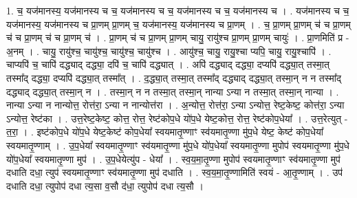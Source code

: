 \documentclass[17pt]{extarticle}
\begin{document}
1. च॒ यज॑मानस्य॒ यज॑मानस्य च च॒ यज॑मानस्य च च॒ यज॑मानस्य च च॒ यज॑मानस्य च । . यज॑मानस्य च च॒ यज॑मानस्य॒ यज॑मानस्य च प्रा॒णम् प्रा॒णम् च॒ यज॑मानस्य॒ यज॑मानस्य च प्रा॒णम् । . च॒ प्रा॒णम् प्रा॒णम् च॑ च प्रा॒णम् च॑ च प्रा॒णम् च॑ च प्रा॒णम् च॑ । . प्रा॒णम् च॑ च प्रा॒णम् प्रा॒णम् चायु॒ रायु॑श्च प्रा॒णम् प्रा॒णम् चायुः॑ । . प्रा॒णमिति॑ प्र - अ॒नम् । . चायु॒ रायु॑श्च॒ चायु॑श्च॒ चायु॑श्च॒ चायु॑श्च । . आयु॑श्च॒ चायु॒ रायु॒श्चा प्यपि॒ चायु॒ रायु॒श्चापि॑ । . चाप्यपि॑ च॒ चापि॑ दद्ध्याद् दद्ध्या॒ दपि॑ च॒ चापि॑ दद्ध्यात् । . अपि॑ दद्ध्याद् दद्ध्या॒ दप्यपि॑ दद्ध्या॒त् तस्मा॒त् तस्मा᳚द् दद्ध्या॒ दप्यपि॑ दद्ध्या॒त् तस्मा᳚त् । . द॒द्ध्या॒त् तस्मा॒त् तस्मा᳚द् दद्ध्याद् दद्ध्या॒त् तस्मा॒न् न न तस्मा᳚द् दद्ध्याद् दद्ध्या॒त् तस्मा॒न् न । . तस्मा॒न् न न तस्मा॒त् तस्मा॒न् नान्या ऽन्या न तस्मा॒त् तस्मा॒न् नान्या । . नान्या ऽन्या न नान्योत्त॒ रोत्त॑रा॒ ऽन्या न नान्योत्त॑रा । . अ॒न्योत्त॒ रोत्त॑रा॒ ऽन्या ऽन्योत्त॒ रेष्ट॒केष्ट॒ कोत्त॑रा॒ ऽन्या ऽन्योत्त॒ रेष्ट॑का । . उत्त॒रेष्ट॒केष्ट॒ कोत्त॒ रोत्त॒ रेष्ट॑कोप॒धे यो॑प॒धे येष्ट॒कोत्त॒ रोत्त॒ रेष्ट॑कोप॒धेया᳚ । . उत्त॒रेत्युत् - त॒रा॒ । . इष्ट॑कोप॒धे यो॑प॒धे येष्ट॒केष्ट॑ कोप॒धेया᳚ स्वयमातृ॒ण्णाꣳ स्व॑यमातृ॒ण्णा मु॑प॒धे येष्ट॒ केष्ट॑ कोप॒धेया᳚ स्वयमातृ॒ण्णाम् । . उ॒प॒धेया᳚ स्वयमातृ॒ण्णाꣳ स्व॑यमातृ॒ण्णा मु॑प॒धे यो॑प॒धेया᳚ स्वयमातृ॒ण्णा मुपोप॑ स्वयमातृ॒ण्णा मु॑प॒धे यो॑प॒धेया᳚ स्वयमातृ॒ण्णा मुप॑ । . उ॒प॒धेयेत्यु॑प - धेया᳚ । . स्व॒य॒मा॒तृ॒ण्णा मुपोप॑ स्वयमातृ॒ण्णाꣳ स्व॑यमातृ॒ण्णा मुप॑ दधाति दधा॒ त्युप॑ स्वयमातृ॒ण्णाꣳ स्व॑यमातृ॒ण्णा मुप॑ दधाति । . स्व॒य॒मा॒तृ॒ण्णामिति॑ स्वयं - आ॒तृ॒ण्णाम् । . उप॑ दधाति दधा॒ त्युपोप॑ दधा त्य॒सा व॒सौ द॑धा॒ त्युपोप॑ दधा त्य॒सौ । \newline
\end{document}

